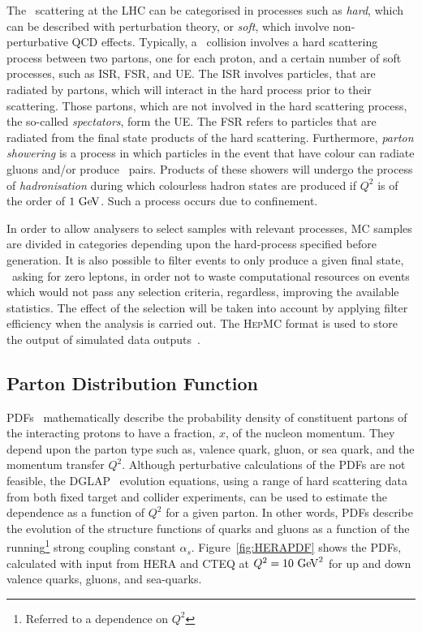 		The \pp\ scattering at the \ac{LHC} can be categorised in processes such as \emph{hard}, which can be described with perturbation theory, or \emph{soft}, which involve non-perturbative \ac{QCD} effects. Typically, a \pp\ collision involves a hard scattering process between two partons, one for each proton, and a certain number of soft processes, such as \ac{ISR}, \ac{FSR}, and \ac{UE}. The \ac{ISR} involves particles, that are radiated by partons, which will interact in the hard process prior to their scattering. Those partons, which are not involved in the hard scattering process, the so-called \emph{spectators}, form the \ac{UE}. The \ac{FSR} refers to particles that are radiated from the final state products of the hard scattering. Furthermore, \emph{parton showering} is a process in which particles in the event that have colour can radiate gluons and/or produce \qqbar\ pairs. Products of these showers will undergo the process of \emph{hadronisation} during which colourless hadron states are produced if $Q^2$ is of the order of $1 \GeV$. Such a process occurs due to confinement. 

		In order to allow analysers to select samples with relevant processes, \ac{MC} samples are divided in categories depending upon the hard-process specified before generation. It is also possible to filter events to only produce a given final state, \eg\ asking for zero leptons, in order not to waste computational resources on events which would not pass any selection criteria, regardless, improving the available statistics. The effect of the selection will be taken into account by applying filter efficiency when the analysis is carried out. The \textsc{HepMC} format is used to store the output of simulated data outputs~\cite{DOBBS200141}.

		\subsection*{Parton Distribution Function}

			\acp{PDF}~\cite{Campbell2007} mathematically describe the probability density of constituent partons of the interacting protons to have a fraction, $x$, of the nucleon momentum. They depend upon the parton type such as, valence quark, gluon, or sea quark, and the momentum transfer $Q^2$. Although perturbative calculations of the \acp{PDF} are not feasible, the \textsc{DGLAP}~\cite{Gribov:1972ri, Altarelli:1977zs} evolution equations, using a range of hard scattering data from both fixed target and collider experiments, can be used to estimate the dependence as a function of $Q^2$ for a given parton. In other words, \acp{PDF} describe the evolution of the structure functions of quarks and gluons as a function of the running\footnote{Referred to a dependence on $Q^2$} strong coupling constant $\alpha_s$. Figure~\ref{fig:HERAPDF} shows the \acp{PDF}, calculated with input from \textsc{HERA} and \textsc{CTEQ} at $Q^2 = 10 \GeV^2$ for up and down valence quarks, gluons, and sea-quarks.

